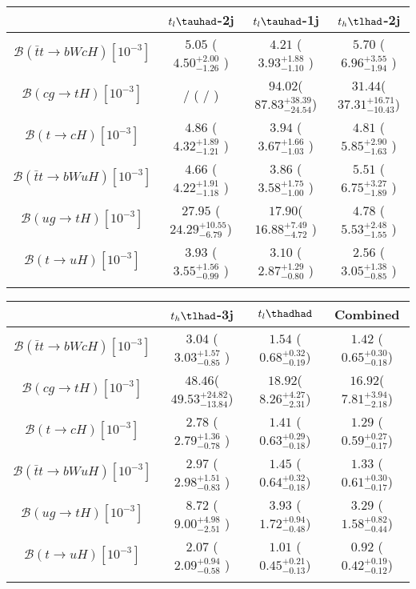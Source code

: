 \centering
\begin{tabular}{cccc} \toprule\toprule
 & $t_l\tauhad$-2j & $t_l\tauhad$-1j & $t_h\tlhad$-2j\\\midrule
$\mathcal{B}(\bar{t}t\to bWcH)[10^{-3}]$              & $5.05$  ($4.50^{+2.00}_{-1.26}$  ) & $4.21$ ($3.93^{+1.88}_{-1.10}$   )& $5.70$ ($6.96^{+3.55}_{-1.94}$   ) \\
$\mathcal{B}(cg\to tH)[10^{-3}]$              &  /      ( /                      ) & $94.02$($87.83^{+38.39}_{-24.54}$)& $31.44$($37.31^{+16.71}_{-10.43}$) \\
$\mathcal{B}(t\to cH)[10^{-3}]$              & $4.86$  ($4.32^{+1.89}_{-1.21}$  ) & $3.94$ ($3.67^{+1.66}_{-1.03}$   )& $4.81$ ($5.85^{+2.90}_{-1.63}$   ) \\
$\mathcal{B}(\bar{t}t\to bWuH)[10^{-3}]$              & $4.66$  ($4.22^{+1.91}_{-1.18}$  ) & $3.86$ ($3.58^{+1.75}_{-1.00}$   )& $5.51$ ($6.75^{+3.27}_{-1.89}$   ) \\
$\mathcal{B}(ug\to tH)[10^{-3}]$              & $27.95$ ($24.29^{+10.55}_{-6.79}$) & $17.90$($16.88^{+7.49}_{-4.72}$  )& $4.78$ ($5.53^{+2.48}_{-1.55}$   ) \\
$\mathcal{B}(t\to uH)[10^{-3}]$              & $3.93$  ($3.55^{+1.56}_{-0.99}$  ) & $3.10$ ($2.87^{+1.29}_{-0.80}$   )& $2.56$ ($3.05^{+1.38}_{-0.85}$   ) \\
\bottomrule\bottomrule\\    
\end{tabular}
\begin{tabular}{cccc} \toprule\toprule
 & $t_h\tlhad$-3j & $t_l\thadhad$ & Combined\\\midrule
$\mathcal{B}(\bar{t}t\to bWcH)[10^{-3}]$         &$3.04$ ($3.03^{+1.57}_{-0.85}$   ) & $1.54$ ($0.68^{+0.32}_{-0.19}$) & $1.42$ ($0.65^{+0.30}_{-0.18}$)\\
$\mathcal{B}(cg\to tH)[10^{-3}]$         &$48.46$($49.53^{+24.82}_{-13.84}$) & $18.92$($8.26^{+4.27}_{-2.31}$) & $16.92$($7.81^{+3.94}_{-2.18}$)\\
$\mathcal{B}(t\to cH)[10^{-3}]$         &$2.78$ ($2.79^{+1.36}_{-0.78}$   ) & $1.41$ ($0.63^{+0.29}_{-0.18}$) & $1.29$ ($0.59^{+0.27}_{-0.17}$)\\
$\mathcal{B}(\bar{t}t\to bWuH)[10^{-3}]$         &$2.97$ ($2.98^{+1.51}_{-0.83}$   ) & $1.45$ ($0.64^{+0.32}_{-0.18}$) & $1.33$ ($0.61^{+0.30}_{-0.17}$)\\
$\mathcal{B}(ug\to tH)[10^{-3}]$         &$8.72$ ($9.00^{+4.98}_{-2.51}$   ) & $3.93$ ($1.72^{+0.94}_{-0.48}$) & $3.29$ ($1.58^{+0.82}_{-0.44}$)\\
$\mathcal{B}(t\to uH)[10^{-3}]$         &$2.07$ ($2.09^{+0.94}_{-0.58}$   ) & $1.01$ ($0.45^{+0.21}_{-0.13}$) & $0.92$ ($0.42^{+0.19}_{-0.12}$)\\
\bottomrule\bottomrule\\
\end{tabular}






